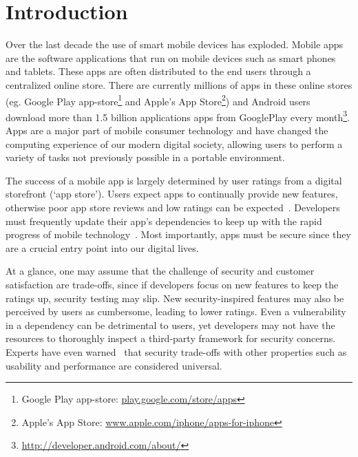 \section{Introduction}

Over the last decade the use of smart mobile devices has exploded. Mobile apps are the software applications that run on mobile devices such as smart phones and tablets. These apps are often distributed to the end users through a centralized online store. There are currently millions of apps in these online stores (eg. Google Play app-store\footnote{Google Play app-store: \url{play.google.com/store/apps}} and Apple's App Store\footnote{Apple's App Store: \url{www.apple.com/iphone/apps-for-iphone}}) and Android users download more than 1.5 billion applications apps from GooglePlay every month\footnote{\url{http://developer.android.com/about/}}. Apps are a major part of mobile consumer technology and have changed the computing experience of our modern digital society, allowing users to perform a variety of tasks not previously possible in a portable environment.







The success of a mobile app is largely determined by user ratings from a digital storefront (`app store'). Users expect apps to continually provide new features, otherwise poor app store reviews and low ratings can be expected~\cite{Khalid2014}. Developers must frequently update their app's dependencies to keep up with the rapid progress of mobile technology~\cite{Syer2013}. Most importantly, apps must be secure since they are a crucial entry point into our digital lives.

At a glance, one may assume that the challenge of security and customer satisfaction are trade-offs, since if developers focus on new features to keep the ratings up, security testing may slip. New security-inspired features may also be perceived by users as cumbersome, leading to lower ratings. Even a vulnerability in a dependency can be detrimental to users, yet developers may not have the resources to thoroughly inspect a third-party framework for security concerns. Experts have even warned~\cite{McGrawBSS} that security trade-offs with other properties such as usability and performance are considered universal.

